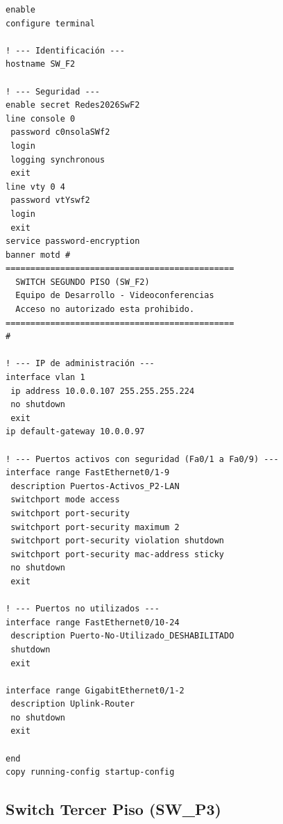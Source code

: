 \documentclass[letterpaper,11pt]{article}
\begin{document}
\begin{lstlisting}[style=cisco, caption={Configuración completa de SW\_F2}]
enable
configure terminal

! --- Identificación ---
hostname SW_F2

! --- Seguridad ---
enable secret Redes2026SwF2
line console 0
 password c0nsolaSWf2
 login
 logging synchronous
 exit
line vty 0 4
 password vtYswf2
 login
 exit
service password-encryption
banner motd #
==============================================
  SWITCH SEGUNDO PISO (SW_F2)
  Equipo de Desarrollo - Videoconferencias
  Acceso no autorizado esta prohibido.
==============================================
#

! --- IP de administración ---
interface vlan 1
 ip address 10.0.0.107 255.255.255.224
 no shutdown
 exit
ip default-gateway 10.0.0.97

! --- Puertos activos con seguridad (Fa0/1 a Fa0/9) ---
interface range FastEthernet0/1-9
 description Puertos-Activos_P2-LAN
 switchport mode access
 switchport port-security
 switchport port-security maximum 2
 switchport port-security violation shutdown
 switchport port-security mac-address sticky
 no shutdown
 exit

! --- Puertos no utilizados ---
interface range FastEthernet0/10-24
 description Puerto-No-Utilizado_DESHABILITADO
 shutdown
 exit

interface range GigabitEthernet0/1-2
 description Uplink-Router
 no shutdown
 exit

end
copy running-config startup-config
\end{lstlisting}

\subsection{Switch Tercer Piso (SW\_P3)}
\end{document}
